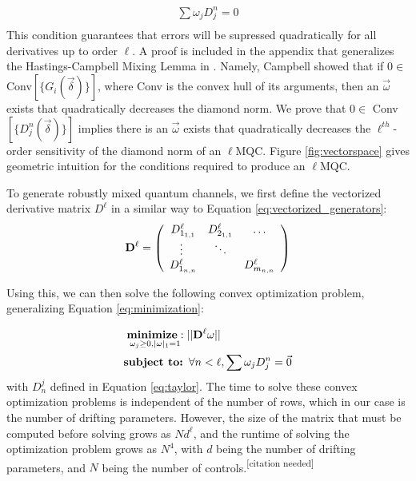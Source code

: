 \documentclass[aps,nofootinbib,pra,notitlepage,twocolumn]{revtex4-1}
\newcommand{\needcite}{{\color{blue}\textsuperscript{[citation needed]}}}
\begin{document}
\begin{equation}\label{eq:MQC-relaxed}
\begin{gathered}
\sum\omega_jD^n_j = 0\\
\end{gathered}
\end{equation}
This condition guarantees that errors will be supressed quadratically for all derivatives up to order $\ell$. A proof is included in the appendix that generalizes the Hastings-Campbell Mixing Lemma in \cite{Campbell2017}. Namely, Campbell showed that if $0\in $ Conv$[\{G_i(\vec{\delta})\}]$, where Conv is the convex hull of its arguments, then an $\vec{\omega}$ exists that quadratically decreases the diamond norm. We prove that $0\in $ Conv$[\{D_j^n(\vec{\delta})\}]$ implies there is an $\vec{\omega}$ exists that quadratically decreases the $\ell^{th}$-order sensitivity of the diamond norm of an $\ell$MQC. Figure \ref{fig:vectorspace} gives geometric intuition for the conditions required to produce an $\ell$MQC.

To generate robustly mixed quantum channels, we first define the vectorized derivative matrix ${D^{\ell}}$ in a similar way to Equation \ref{eq:vectorized_generators}:
\begin{equation}
{\bold{D}^{\ell}} =  \left(\begin{array}{cccc}
		D^\ell_{1_{1,1}} & D^\ell_{2_{1,1}} & \ldots   \\ 
		\vdots\ & \ddots &    \\
		D^\ell_{1_{n,n}} &  &  D^\ell_{m_{n,n}} \\ 
	\end{array} 	
	\right)
\end{equation}

Using this, we can then solve the following convex optimization problem, generalizing Equation \ref{eq:minimization}:

\begin{equation}\label{eq:robust_minimization}
  \begin{split}
    &\underset{\omega_j\geq0, |\omega|_1=1}{\textbf{minimize}: } ||{\bold{D}^{\ell}}\omega||\\
    &\textbf{subject to: } \forall n<\ell, \sum \omega_jD_j^n=\vec{0}\\
  \end{split}
\end{equation}
with $D_n^j$ defined in Equation \ref{eq:taylor}. The time to solve these convex optimization problems is independent of the number of rows, which in our case is the number of drifting parameters. However, the size of the matrix that must be computed before solving grows as $Nd^{\ell}$, and the runtime of solving the optimization problem grows as $N^4$, with $d$ being the number of drifting parameters, and $N$ being the number of controls.\needcite
\end{document}
